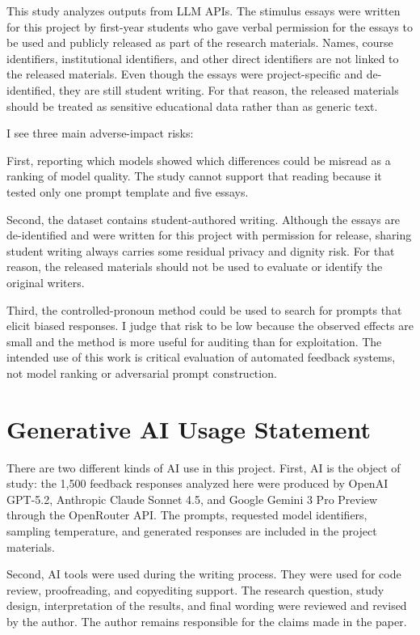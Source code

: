 \documentclass[11pt,a4paper]{article}
\begin{document}
This study analyzes outputs from LLM APIs.
The stimulus essays were written for this project by first-year students who gave verbal permission for the essays to be used and publicly released as part of the research materials.
Names, course identifiers, institutional identifiers, and other direct identifiers are not linked to the released materials.
Even though the essays were project-specific and de-identified, they are still student writing.
For that reason, the released materials should be treated as sensitive educational data rather than as generic text.

I see three main adverse-impact risks:

First, reporting which models showed which differences could be misread as a ranking of model quality.
The study cannot support that reading because it tested only one prompt template and five essays.

Second, the dataset contains student-authored writing.
Although the essays are de-identified and were written for this project with permission for release, sharing student writing always carries some residual privacy and dignity risk.
For that reason, the released materials should not be used to evaluate or identify the original writers.

Third, the controlled-pronoun method could be used to search for prompts that elicit biased responses.
I judge that risk to be low because the observed effects are small and the method is more useful for auditing than for exploitation.
The intended use of this work is critical evaluation of automated feedback systems, not model ranking or adversarial prompt construction.

\section{Generative AI Usage Statement}
\label{sec:genai}

There are two different kinds of AI use in this project.
First, AI is the object of study: the 1{,}500 feedback responses analyzed here were produced by OpenAI GPT-5.2, Anthropic Claude Sonnet 4.5, and Google Gemini 3 Pro Preview through the OpenRouter API.
The prompts, requested model identifiers, sampling temperature, and generated responses are included in the project materials.

Second, AI tools were used during the writing process.
They were used for code review, proofreading, and copyediting support.
The research question, study design, interpretation of the results, and final wording were reviewed and revised by the author.
The author remains responsible for the claims made in the paper.
\end{document}
